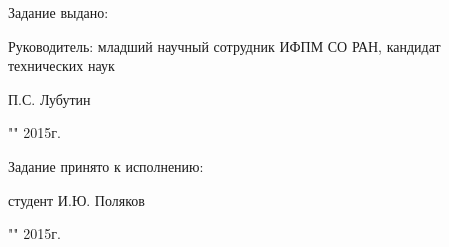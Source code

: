 \newpage
Задание выдано:

Руководитель: младший научный сотрудник ИФПМ СО РАН, кандидат технических наук \\
\begin{singlespace}
П.С. Лубутин \hfill \underline{\hspace{6cm}} \\
\begin{flushright} "\underline{\hspace{1cm}}"\underline{\hspace{3cm}} 2015г. \end{flushright}
\end{singlespace}

Задание принято к исполнению:

\begin{singlespace}
студент И.Ю. Поляков \hfill \underline{\hspace{6cm}} \\
\begin{flushright} "\underline{\hspace{1cm}}"\underline{\hspace{3cm}} 2015г. \end{flushright}
\end{singlespace}